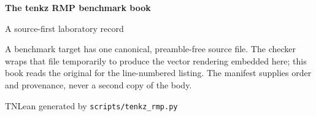 \documentclass[10pt,twoside]{article}
\providecommand\TenkzRMPGeneratedIndex{rmp-benchmark-index.tex}
\begin{document}
\begin{titlepage}
  \centering
  \vspace*{28mm}
  {\Huge\bfseries The tenkz RMP benchmark book\par}
  \vspace{5mm}
  {\Large A source-first laboratory record\par}
  \vspace{16mm}
  \begin{minipage}{.66\textwidth}
    A benchmark target has one canonical, preamble-free source file.  The
    checker wraps that file temporarily to produce the vector rendering
    embedded here; this book reads the original for the line-numbered listing.
    The manifest supplies order and provenance, never a second copy of the
    body.
  \end{minipage}
  \vfill
  {\small TNLean \textbullet{} generated by \texttt{scripts/tenkz\_rmp.py}\par}
\end{titlepage}

\tableofcontents
\clearpage

\end{document}
